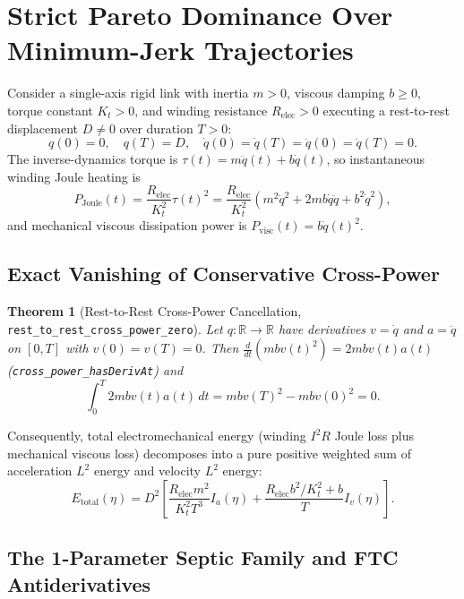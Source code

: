 \documentclass[10pt,twocolumn]{article}
\newtheorem{theorem}{Theorem}[section]
\theoremstyle{definition}
\begin{document}
\section{Strict Pareto Dominance Over Minimum-Jerk Trajectories}

Consider a single-axis rigid link with inertia $m > 0$, viscous damping $b \ge 0$, torque constant $K_t > 0$, and winding resistance $R_{\text{elec}} > 0$ executing a rest-to-rest displacement $D \neq 0$ over duration $T > 0$:
\begin{equation}
  q(0)=0,\quad q(T)=D,\quad \dot{q}(0)=\dot{q}(T)=\ddot{q}(0)=\ddot{q}(T)=0.
  \label{eq:rest_to_rest}
\end{equation}
The inverse-dynamics torque is $\tau(t) = m\ddot{q}(t) + b\dot{q}(t)$, so instantaneous winding Joule heating is
\begin{equation}
  P_{\text{Joule}}(t) = \frac{R_{\text{elec}}}{K_t^2}\tau(t)^2
  = \frac{R_{\text{elec}}}{K_t^2}\!\left(m^2\ddot{q}^2 + 2mb\dot{q}\ddot{q} + b^2\dot{q}^2\right),
\end{equation}
and mechanical viscous dissipation power is $P_{\text{visc}}(t) = b\dot{q}(t)^2$.

\subsection{Exact Vanishing of Conservative Cross-Power}

\begin{theorem}[Rest-to-Rest Cross-Power Cancellation, \texttt{rest\_to\_rest\_cross\_power\_zero}]
Let $q : \mathbb{R} \to \mathbb{R}$ have derivatives $v = \dot{q}$ and $a = \ddot{q}$ on $[0, T]$ with $v(0) = v(T) = 0$. Then $\frac{d}{dt}\!\left(m b v(t)^2\right) = 2 m b v(t)a(t)$ (\texttt{cross\_power\_hasDerivAt}) and
\begin{equation}
  \int_0^T 2 m b v(t)a(t)\,dt = m b v(T)^2 - m b v(0)^2 = 0.
\end{equation}
\end{theorem}
Consequently, total electromechanical energy (winding $I^2R$ Joule loss plus mechanical viscous loss) decomposes into a pure positive weighted sum of acceleration $L^2$ energy and velocity $L^2$ energy:
\begin{equation}
  E_{\text{total}}(\eta) = D^2\!\left[\frac{R_{\text{elec}} m^2}{K_t^2 T^3} I_a(\eta) + \frac{R_{\text{elec}} b^2 / K_t^2 + b}{T} I_v(\eta)\right].
  \label{eq:e_total}
\end{equation}

\subsection{The 1-Parameter Septic Family and FTC Antiderivatives}
\end{document}
